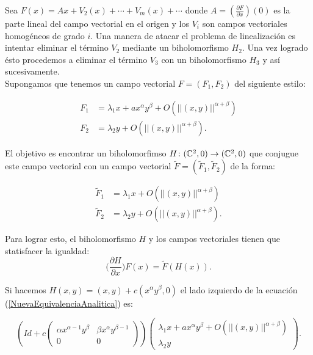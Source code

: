 Sea $F(x)=Ax+V_{2}(x)+\cdots+V_{m}(x)+\cdots$ donde $A=(\tfrac{\partial F}{\partial x})(0)$ es la parte lineal del campo vectorial en el origen y los $V_{i}$ son campos vectoriales homogéneos de grado $i$. Una manera de atacar el problema de linealización es intentar eliminar el término $V_{2}$ mediante un biholomorfismo $H_{2}$. Una vez logrado ésto procedemos a eliminar el término $V_{3}$ con un biholomorfismo $H_{3}$ y así sucesivamente.\\

Supongamos que tenemos un campo vectorial  $F=(F_{1},F_{2})$ del siguiente estilo:

\begin{equation}
\label{CampoVectInicial}
\begin{aligned}
F_{1} &= \lambda_{1}x +ax^{\alpha}y^{\beta}+O(||(x,y)||^{\alpha+\beta})\\
F_{2} &= \lambda_{2}y + O(||(x,y)||^{\alpha+\beta}).
\end{aligned}
\end{equation}

\noindent El objetivo es encontrar un biholomorfimso $H\colon (\mathbb{C}^{2},0)\rightarrow(\mathbb{C}^{2},0)$ que conjugue este campo vectorial con un campo vectorial $\tilde{F}=(\tilde{F}_{1},\tilde{F}_{2})$ de la forma:

\begin{equation}
\label{CampoVectFinal}
\begin{aligned}
\tilde{F}_{1} &= \lambda_{1}x +O(||(x,y)||^{\alpha+\beta})\\
\tilde{F}_{2} &= \lambda_{2}y + O(||(x,y)||^{\alpha+\beta}).
\end{aligned}
\end{equation}

\noindent Para lograr esto, el biholomorfismo $H$ y los campos vectoriales tienen que statisfacer la igualdad:
\begin{equation}
\label{NuevaEquivalenciaAnalitica}
\Big(\frac{\partial H}{\partial x}\Big)F(x)=\tilde{F}(H(x)).
\end{equation}


\noindent Si hacemos $H(x,y)=(x,y)+c(x^{\alpha}y^{\beta},0)$ el lado izquierdo de la ecuación (\ref{NuevaEquivalenciaAnalitica}) es:

\begin{equation*}
(Id+c\begin{pmatrix} \alpha x^{\alpha -1}y^{\beta} & \beta x^{\alpha}y^{\beta -1} \\ 0 & 0 \end{pmatrix})\begin{pmatrix}\lambda_{1}x +ax^{\alpha}y^{\beta}+O(||(x,y)||^{\alpha+\beta})\\ \lambda_{2}y \end{pmatrix}.
\end{equation*} 

